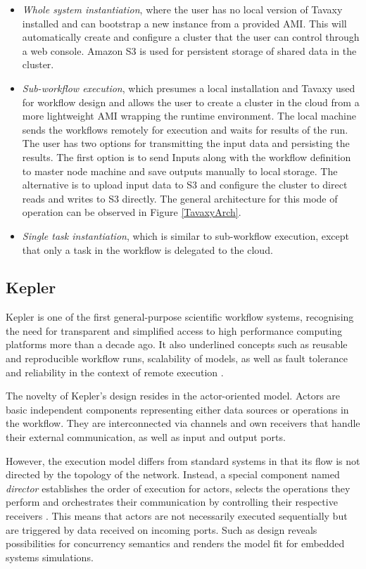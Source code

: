 \begin{itemize}
	\item \textit{Whole system instantiation}, where the user has no local version of Tavaxy installed and can bootstrap a new instance from a provided AMI. This will automatically create and configure a cluster that the user can control through a web console. Amazon S3 \cite{S3} is used for persistent storage of shared data in the cluster.
	\item \textit{Sub-workflow execution}, which presumes a local installation and Tavaxy used for workflow design and allows the user to create a cluster in the cloud from a more lightweight AMI wrapping the runtime environment. The local machine sends the workflows remotely for execution and waits for results of the run. The user has two options for transmitting the input data and persisting the results. The first option is to send Inputs along with the workflow definition to master node machine and save outputs manually to local storage. The alternative is to upload input data to S3 and configure the cluster to direct reads and writes to S3 directly. The general architecture for this mode of operation can be observed in Figure \ref{TavaxyArch}.
	\item \textit{Single task instantiation}, which is similar to sub-workflow execution, except that only a task in the workflow is delegated to the cloud.
\end{itemize}

\subsection{Kepler}

Kepler \cite{Kepler} is one of the first general-purpose scientific workflow systems, recognising the need for transparent and simplified access to high performance computing platforms more than a decade ago. It also underlined concepts such as reusable and reproducible workflow runs, scalability of models, as well as fault tolerance and reliability in the context of remote execution \cite{Ludascher2006}.

The novelty of Kepler's design resides in the actor-oriented model. Actors are basic independent components representing either data sources or operations in the workflow. They are interconnected via channels and own receivers that handle their external communication, as well as input and output ports.

However, the execution model differs from standard systems in that its flow is not directed by the topology of the network. Instead, a special component named \textit{director} establishes the order of execution for actors, selects the operations they perform and orchestrates their communication by controlling their respective receivers \cite{Curcin2008}. This means that actors are not necessarily executed sequentially but are triggered by data received on incoming ports. Such as design reveals possibilities for concurrency semantics and renders the model fit for embedded systems simulations.

